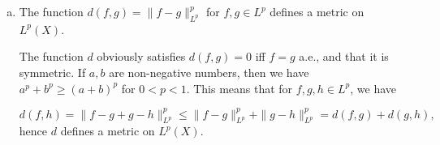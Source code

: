 \documentclass{article}
\begin{document}
\begin{enumerate}
\begin{enumerate}[(a)]
        \begin{solution}
            We have
            \begin{align*}
                \int \abs{f_1+f_2}^p &= \int f_1(f_1+f_2)^{p-1} + \int f_2(f_1+f_2)^{p-1}\\
                &\geq \|f_1\|_{L^p} \|(f_1+f_2)^{p-1}\|_{L^q} + \|f_2\|_{L^p} \|(f_1+f_2)^{p-1}\|_{L^q}\\
                &= (\|f_1\|_{L^p} + \|f_2\|_{L^p}) \|(f_1+f_2)\|_{L^p}^{p-1}
            \end{align*}
            which proves the statement.
        \end{solution}
        \item The function $d(f,g)=\|f-g\|_{L^p}^p$ for $f,g\in L^p$ defines a metric
        on $L^p(X)$.

        \begin{solution}
            The function $d$ obviously satisfies $d(f,g)=0$ iff $f=g$ a.e., and that it is symmetric.
            If $a,b$ are non-negative numbers, then we have $a^p+b^p\geq (a+b)^p$ for $0<p<1$. This means that for $f,g,h\in L^p$, we have

            $$d(f,h) = \|f-g+g-h\|_{L^p}^p \leq \|f-g\|_{L^p}^p + \|g-h\|_{L^p}^p = d(f,g)+d(g,h),$$
            hence $d$ defines a metric on $L^p(X)$. 
        \end{solution}
    \end{enumerate}
\end{enumerate}
\end{document}
